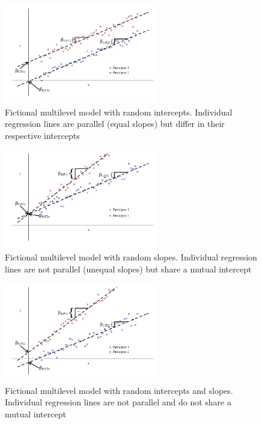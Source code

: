 \documentclass[
]{article}
\begin{document}
\begin{figure}[H]
\centering
\captionsetup{width=0.6\textwidth}
\includegraphics[width=0.6\textwidth]{rand_int.png}
\caption{Fictional multilevel model with random intercepts. Individual regression lines are parallel (equal slopes) but differ in their respective intercepts}
\label{fig-rand-int}
\end{figure}

\begin{figure}[H]
\centering
\captionsetup{width=0.6\textwidth}
\includegraphics[width=0.6\textwidth]{rand_slope.png}
\caption{Fictional multilevel model with random slopes. Individual regression lines are not parallel (unequal slopes) but share a mutual intercept}
\label{fig-rand-slope}
\end{figure}

\begin{figure}[H]
\centering
\captionsetup{width=0.6\textwidth}
\includegraphics[width=0.6\textwidth]{rand_int_slope.png}
\caption{Fictional multilevel model with random intercepts and slopes. Individual regression lines are not parallel and do not share a mutual intercept}
\label{fig-rand-int-slope}
\end{figure}
\end{document}

